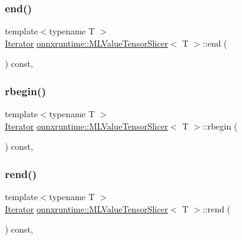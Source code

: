 \subsubsection{\texorpdfstring{end()}{end()}}
{\footnotesize\ttfamily template$<$typename T $>$ \\
\mbox{\hyperlink{classonnxruntime_1_1MLValueTensorSlicer_1_1Iterator}{Iterator}} \mbox{\hyperlink{classonnxruntime_1_1MLValueTensorSlicer}{onnxruntime\+::\+M\+L\+Value\+Tensor\+Slicer}}$<$ T $>$\+::end (\begin{DoxyParamCaption}{ }\end{DoxyParamCaption}) const\hspace{0.3cm}{\ttfamily [inline]}, {\ttfamily [noexcept]}}

\mbox{\label{classonnxruntime_1_1MLValueTensorSlicer_ac20f401c1a705f484b8733c10eaf23ff}} 
\subsubsection{\texorpdfstring{rbegin()}{rbegin()}}
{\footnotesize\ttfamily template$<$typename T $>$ \\
\mbox{\hyperlink{classonnxruntime_1_1MLValueTensorSlicer_1_1Iterator}{Iterator}} \mbox{\hyperlink{classonnxruntime_1_1MLValueTensorSlicer}{onnxruntime\+::\+M\+L\+Value\+Tensor\+Slicer}}$<$ T $>$\+::rbegin (\begin{DoxyParamCaption}{ }\end{DoxyParamCaption}) const\hspace{0.3cm}{\ttfamily [inline]}, {\ttfamily [noexcept]}}

\mbox{\label{classonnxruntime_1_1MLValueTensorSlicer_a83c331a5f9c9ba240a074e8e86919ff0}} 
\subsubsection{\texorpdfstring{rend()}{rend()}}
{\footnotesize\ttfamily template$<$typename T $>$ \\
\mbox{\hyperlink{classonnxruntime_1_1MLValueTensorSlicer_1_1Iterator}{Iterator}} \mbox{\hyperlink{classonnxruntime_1_1MLValueTensorSlicer}{onnxruntime\+::\+M\+L\+Value\+Tensor\+Slicer}}$<$ T $>$\+::rend (\begin{DoxyParamCaption}{ }\end{DoxyParamCaption}) const\hspace{0.3cm}{\ttfamily [inline]}, {\ttfamily [noexcept]}}



